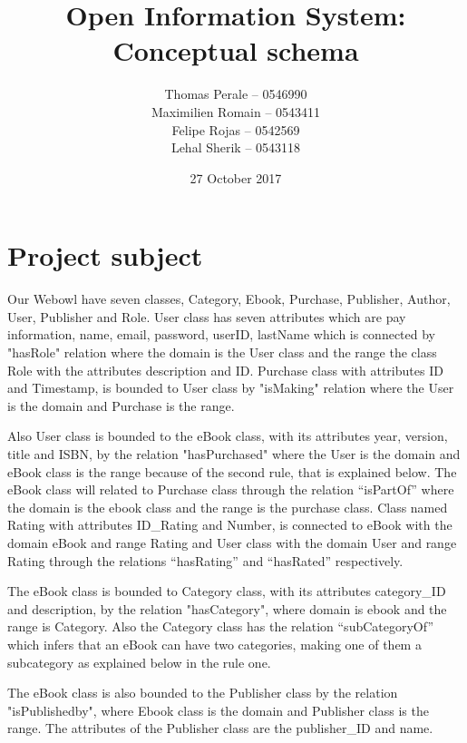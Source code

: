 \documentclass[a4paper,11pt]{article}
\begin{document}
\title{Open Information System: Conceptual schema}
\author{Thomas Perale -- 0546990\\Maximilien Romain -- 0543411\\Felipe Rojas -- 0542569\\Lehal Sherik -- 0543118}
\date{27 October 2017}

\maketitle

\section{Project subject}

Our Webowl have seven classes, Category, Ebook, Purchase, Publisher, Author, User, Publisher and Role.
User class has seven attributes which are pay information, name, email, password, userID, lastName which is connected by "hasRole" relation where the domain is the User class and the range the class Role with the attributes description and ID. Purchase class with attributes ID and Timestamp, is bounded to User class by "isMaking" relation where the User is the domain and Purchase is the range. 


Also User class is bounded to the eBook class, with its attributes year, version, title and ISBN, by the relation "hasPurchased" where the User is the domain and eBook class is the range because of the second rule, that is explained below. The eBook class will related to Purchase class through the relation “isPartOf” where the domain is the ebook class and the range is the purchase class. 
Class named Rating with attributes ID\_Rating and Number, is connected to eBook with the domain eBook and range Rating and User class with the domain User and range Rating through the relations “hasRating” and “hasRated” respectively.

The eBook class is bounded to Category class, with its attributes category\_ID and description, by the relation "hasCategory", where domain is ebook and the range is Category. Also the Category class has the relation “subCategoryOf” which infers that an eBook can have two categories, making one of them a subcategory as explained below in the rule one.

The eBook class is also bounded to the Publisher class by the relation "isPublishedby", where Ebook class is the domain and Publisher class is the range. The attributes of the Publisher class are the publisher\_ID and name. 
\end{document}
